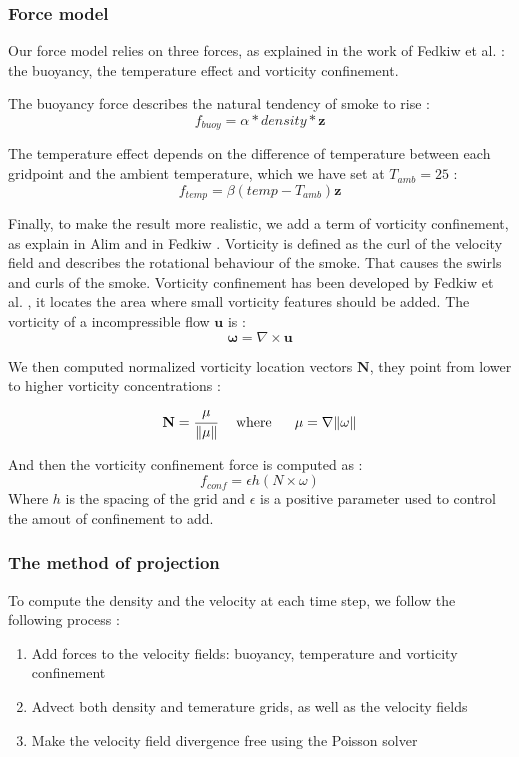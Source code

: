 \documentclass[accepted,single]{gipaper}
\begin{document}
\subsubsection{Force model}
 Our force model relies on three forces, as explained in the work of Fedkiw et al. \cite{Fedkiw:2001} : the buoyancy, the temperature effect and vorticity confinement.

The buoyancy force describes the natural tendency of smoke to rise : 
$$ f_{buoy} = \alpha * density * \mathbf{z}$$

The temperature effect depends on the difference of temperature between each gridpoint and the ambient temperature, which we have set at $T_{amb} = 25$ : 
$$f_{temp} = \beta(temp-T_{amb})\mathbf{z}$$

Finally, to make the result more realistic, we add a term of vorticity confinement, as explain in Alim and in Fedkiw \cite{alim:ms,Fedkiw:2001}.
Vorticity is defined  as the curl of the velocity field and describes the rotational behaviour of the smoke. That causes the swirls and curls of the smoke.
Vorticity confinement has been developed by Fedkiw et al. \cite{Fedkiw:2001}, it locates the area where small vorticity features should be added.
The vorticity of a incompressible flow $\mathbf{u}$ is :
$$\mathbf{\omega} = \nabla \times \mathbf{u}$$

We then computed normalized vorticity location vectors $\mathbf{N}$, they point from lower to higher vorticity concentrations : 
$$ \mathbf{N} = \cfrac{\mathbf{\mu}}{\Vert \mathbf{\mu} \Vert} ~~~\text{where} ~~~~ \mathbf{\mu}=\nabla \Vert \omega \Vert $$

And then the vorticity confinement force is computed as :
$$f_{conf} = \epsilon h (N \times \omega)$$
Where $h$ is the spacing of the grid and $\epsilon$ is a positive parameter used to control the amout of confinement to add.

\subsubsection{The method of projection}
To compute the density and the velocity at each time step, we follow the following process :
\begin{enumerate}
\item Add forces to the velocity fields: buoyancy, temperature and vorticity confinement
\item Advect both density and temerature grids, as well as the velocity fields
\item Make the velocity field divergence free using the Poisson solver
\end{enumerate}
\end{document}
